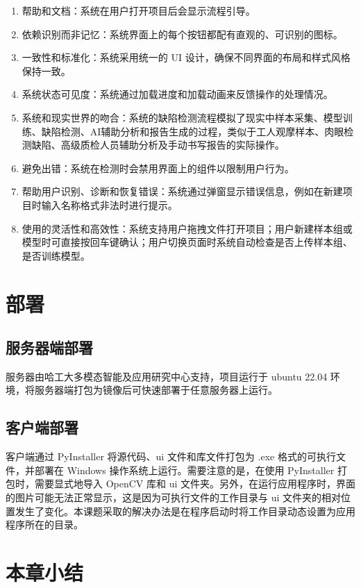 \documentclass[
  ]{njuthesis}
\begin{document}
\begin{enumerate}
    \item 帮助和文档：系统在用户打开项目后会显示流程引导。
    \item 依赖识别而非记忆：系统界面上的每个按钮都配有直观的、可识别的图标。
    \item 一致性和标准化：系统采用统一的 UI 设计，确保不同界面的布局和样式风格保持一致。
    \item 系统状态可见度：系统通过加载进度和加载动画来反馈操作的处理情况。
    \item 系统和现实世界的吻合：系统的缺陷检测流程模拟了现实中样本采集、模型训练、缺陷检测、AI辅助分析和报告生成的过程，类似于工人观摩样本、肉眼检测缺陷、高级质检人员辅助分析及手动书写报告的实际操作。
    \item 避免出错：系统在检测时会禁用界面上的组件以限制用户行为。
    \item 帮助用户识别、诊断和恢复错误：系统通过弹窗显示错误信息，例如在新建项目时输入名称格式非法时进行提示。
    \item 使用的灵活性和高效性：系统支持用户拖拽文件打开项目；用户新建样本组或模型时可直接按回车键确认；用户切换页面时系统自动检查是否上传样本组、是否训练模型。
\end{enumerate}

\section{部署}

\subsection{服务器端部署}

服务器由哈工大多模态智能及应用研究中心支持，项目运行于 ubuntu 22.04 环境，将服务器端打包为镜像后可快速部署于任意服务器上运行。

\subsection{客户端部署}

客户端通过 PyInstaller 将源代码、ui 文件和库文件打包为 .exe 格式的可执行文件，并部署在 Windows 操作系统上运行。需要注意的是，在使用 PyInstaller 打包时，需要显式地导入 OpenCV 库和 ui 文件夹。另外，在运行应用程序时，界面的图片可能无法正常显示，这是因为可执行文件的工作目录与 ui 文件夹的相对位置发生了变化。本课题采取的解决办法是在程序启动时将工作目录动态设置为应用程序所在的目录。

\section{本章小结}
\end{document}
